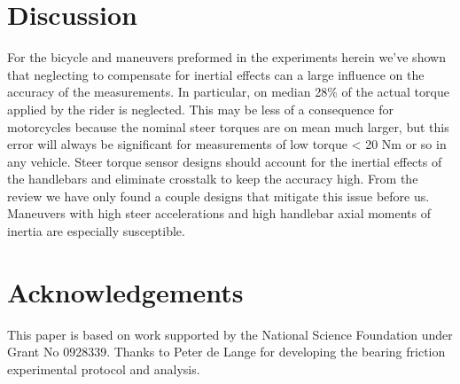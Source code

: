 \documentclass[a4paper]{article}
\begin{document}
\section*{Discussion}

For the bicycle and maneuvers preformed in the experiments herein we've shown
that neglecting to compensate for inertial effects can a large influence on the
accuracy of the measurements. In particular, on median 28\% of the actual
torque applied by the rider is neglected. This may be less of a consequence for
motorcycles because the nominal steer torques are on mean much larger, but this
error will always be significant for measurements of low torque < 20 Nm or so
in any vehicle. Steer torque sensor designs should account for the inertial
effects of the handlebars and eliminate crosstalk to keep the accuracy high.
From the review we have only found a couple designs that mitigate this issue
before us. Maneuvers with high steer accelerations and high handlebar axial
moments of inertia are especially susceptible.

\section*{Acknowledgements}

This paper is based on work supported by the National Science Foundation under
Grant No 0928339. Thanks to Peter de Lange for developing the bearing friction
experimental protocol and analysis.



\end{document}
